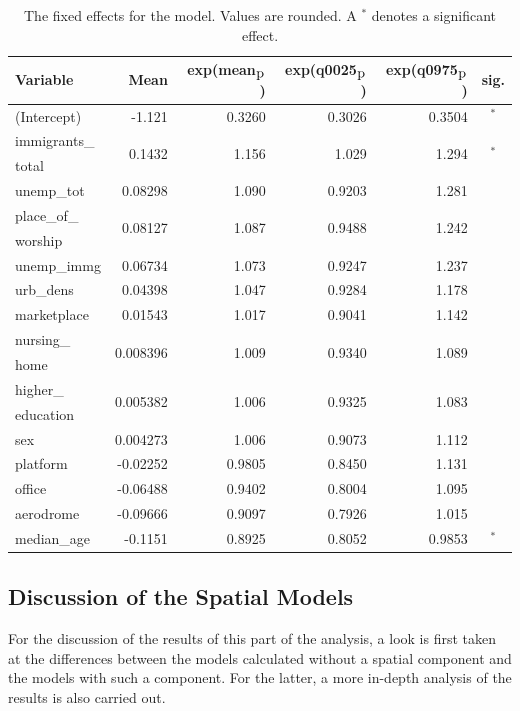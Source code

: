 \begin{table}[H]
\caption{The fixed effects for the model. Values are rounded. A $^*$ denotes a significant effect. \label{fixedAllNorway_spatial}}
\begin{tabular}{l r r r r c}
\toprule
\textbf{Variable}	& \textbf{Mean}	& \textbf{exp(mean$_{\hbox{p}}$)} & \textbf{exp(q0025$_{\hbox{p}}$)} & \textbf{exp(q0975$_{\hbox{p}}$)} & \textbf{sig.}\\
\midrule
(Intercept) & -1.121 & 0.3260 & 0.3026 & 0.3504 & $^*$ \\
immigrants\_ & \multirow{2}{*}{0.1432} & \multirow{2}{*}{1.156} & \multirow{2}{*}{1.029} & \multirow{2}{*}{1.294} & \multirow{2}{*}{$^*$} \\
total \\
unemp\_tot & 0.08298 & 1.090 & 0.9203 & 1.281 \\
place\_of\_ & \multirow{2}{*}{0.08127} & \multirow{2}{*}{1.087} & \multirow{2}{*}{0.9488} & \multirow{2}{*}{1.242} \\
worship \\
unemp\_immg & 0.06734 & 1.073 & 0.9247 & 1.237 & \\
urb\_dens & 0.04398 & 1.047 & 0.9284 & 1.178 \\
marketplace & 0.01543 & 1.017 & 0.9041 & 1.142 \\
nursing\_ & \multirow{2}{*}{0.008396} & \multirow{2}{*}{1.009} & \multirow{2}{*}{0.9340} & \multirow{2}{*}{1.089} \\
home \\
higher\_ & \multirow{2}{*}{0.005382} & \multirow{2}{*}{1.006} & \multirow{2}{*}{0.9325} & \multirow{2}{*}{1.083} \\
education\\
sex & 0.004273 & 1.006 & 0.9073 & 1.112\\
platform & -0.02252 & 0.9805 & 0.8450 & 1.131 \\
office & -0.06488 & 0.9402 & 0.8004 & 1.095 \\
aerodrome & -0.09666 & 0.9097 & 0.7926 & 1.015 \\
median\_age & -0.1151  & 0.8925 & 0.8052 & 0.9853 & $^*$ \\
\bottomrule
\end{tabular}
\end{table}
\clearpage
\subsection{Discussion of the Spatial Models}
For the discussion of the results of this part of the analysis, a look is first taken at the differences between the models calculated without a spatial component and the models with such a component. For the latter, a more in-depth analysis of the results is also carried out.
